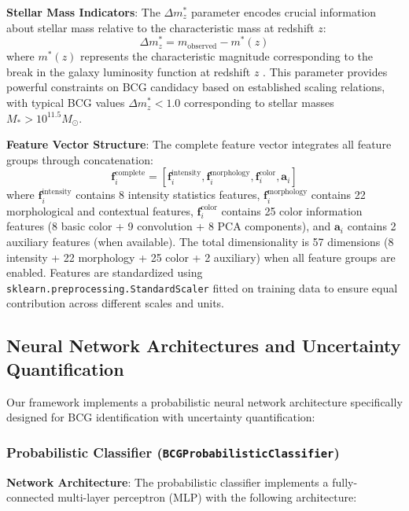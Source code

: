 \documentclass[twocolumn,10pt]{aastex631}
\begin{document}
\textbf{Stellar Mass Indicators}: The $\Delta m^*_z$ parameter encodes crucial information about stellar mass relative to the characteristic mass at redshift $z$:
\begin{equation}
\Delta m^*_z = m_{\text{observed}} - m^*(z)
\end{equation}
where $m^*(z)$ represents the characteristic magnitude corresponding to the break in the galaxy luminosity function at redshift $z$ \citep{Rykoff2016DES}. This parameter provides powerful constraints on BCG candidacy based on established scaling relations, with typical BCG values $\Delta m^*_z < 1.0$ corresponding to stellar masses $M_* > 10^{11.5} M_{\odot}$.

\textbf{Feature Vector Structure}: The complete feature vector integrates all feature groups through concatenation:
\begin{equation}
\mathbf{f}_i^{\text{complete}} = [\mathbf{f}_i^{\text{intensity}}, \mathbf{f}_i^{\text{morphology}}, \mathbf{f}_i^{\text{color}}, \mathbf{a}_i]
\end{equation}
where $\mathbf{f}_i^{\text{intensity}}$ contains 8 intensity statistics features, $\mathbf{f}_i^{\text{morphology}}$ contains 22 morphological and contextual features, $\mathbf{f}_i^{\text{color}}$ contains 25 color information features (8 basic color + 9 convolution + 8 PCA components), and $\mathbf{a}_i$ contains 2 auxiliary features (when available). The total dimensionality is 57 dimensions (8 intensity + 22 morphology + 25 color + 2 auxiliary) when all feature groups are enabled. Features are standardized using \texttt{sklearn.preprocessing.StandardScaler} fitted on training data to ensure equal contribution across different scales and units.

\subsection{Neural Network Architectures and Uncertainty Quantification}

Our framework implements a probabilistic neural network architecture specifically designed for BCG identification with uncertainty quantification:

\subsubsection{Probabilistic Classifier (\texttt{BCGProbabilisticClassifier})}

\textbf{Network Architecture}: The probabilistic classifier implements a fully-connected multi-layer perceptron (MLP) with the following architecture:
\end{document}
